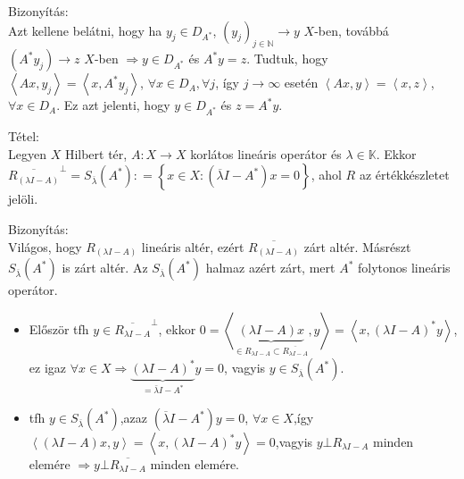 \documentclass[12pt,a4paper]{scrartcl}
\providecommand{\tightlist}{%
  \setlength{\itemsep}{0pt}\setlength{\parskip}{0pt}}
\newenvironment{tetel}{}{}
\newenvironment{bizonyitas}{}{}
\begin{document}
\begin{bizonyitas}

Bizonyítás:\\
Azt kellene belátni, hogy ha \(y_{j} \in D_{A^{*}}\),
\(\left. \left( y_{j} \right)_{j \in {\mathbb{N}}}\rightarrow y \right.\)
\(X\)-ben, továbbá
\(\left. \left( {A^{*}y_{j}} \right)\rightarrow z \right.\) \(X\)-ben
\(\left. \Rightarrow y \in D_{A^{*}} \right.\) és \(A^{*}y = z\).
Tudtuk, hogy
\(\left\langle {Ax,y_{j}} \right\rangle = \left\langle {x,A^{*}y_{j}} \right\rangle\),
\(\forall x \in D_{A},\forall j\), így
\(\left. j\rightarrow\infty \right.\) esetén
\(\left\langle {Ax,y} \right\rangle = \left\langle {x,z} \right\rangle\),
\(\forall x \in D_{A}\). Ez azt jelenti, hogy \(y \in D_{A^{*}}\) és
\(z = A^{*}y\).

\end{bizonyitas}

\begin{tetel}

Tétel:\\
Legyen \(X\) Hilbert tér, \(\left. A:X\rightarrow X \right.\) korlátos
lineáris operátor és \(\lambda \in {\mathbb{K}}\). Ekkor
\({\overline{R_{({\lambda I-A})}}}^{\bot} = S_{\overline{\lambda}}\left( A^{*} \right): = \left\{ {x \in X:\left( {\overline{\lambda}I - A^{*}} \right)x = 0} \right\}\),
ahol \(R\) az értékkészletet jelöli.

\end{tetel}

\begin{bizonyitas}

Bizonyítás:\\
Világos, hogy \(R_{({\lambda I - A})}\) lineáris altér, ezért
\(\overline{R_{({\lambda I-A})}}\) zárt altér. Másrészt
\(S_{\overline{\lambda}}\left( A^{*} \right)\) is zárt altér. Az
\(S_{\overline{\lambda}}\left( A^{*} \right)\) halmaz azért zárt, mert
\(A^{*}\) folytonos lineáris operátor.

\begin{itemize}
\tightlist
\item
  Először tfh \(y \in {\overline{R_{\lambda I-A}}}^{\bot}\), ekkor
  \(0 = \left\langle {\underbrace {\left( {\lambda I - A} \right)x}_{ \in {R_{\lambda I - A}} \subset \overline {{R_{\lambda I - A}}} },y} \right\rangle = \left\langle {x,{{\left( {\lambda I - A} \right)}^ * }y} \right\rangle\),
  ez igaz
  \(\forall x \in X \Rightarrow \underbrace {{{\left( {\lambda I - A} \right)}^ * }}_{ = \bar \lambda I - {A^ * }}y = 0\),
  vagyis \(y \in S_{\overline{\lambda}}\left( A^{*} \right)\).
\item
  tfh \(y \in S_{\overline{\lambda}}\left( A^{*} \right)\),azaz
  \(\left( {\overline{\lambda}I - A^{*}} \right)y = 0\),
  \(\forall x \in X\),így
  \(\left\langle {\left( {\lambda I - A} \right)x,y} \right\rangle = \left\langle {x,\left( {\lambda I - A} \right)^{*}y} \right\rangle = 0\),vagyis
  \(y\bot R_{\lambda I - A}\) minden elemére
  \(\left. \Rightarrow y\bot\overline{R_{\lambda I-A}} \right.\) minden
  elemére.
\end{itemize}

\end{bizonyitas}
\end{document}
